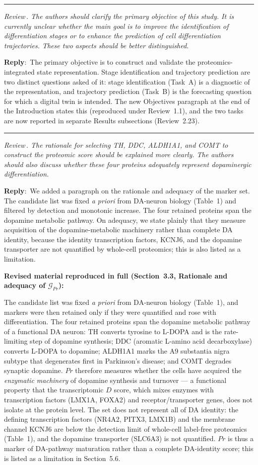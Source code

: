 \documentclass[11pt]{article}
\newcounter{reviewer}
\newcounter{point}[reviewer]
\renewcommand{\thepoint}{Review\,\thereviewer.\arabic{point}}
\newcommand{\point}[1]{\refstepcounter{point}  \bigskip \hrule \medskip \noindent \textit{{\fontseries{b}\selectfont \thepoint } #1}\par}
\newcommand{\reply}{\medskip \noindent \textbf{Reply}:\ }
\newcommand{\revisedheading}[1]{\medskip\noindent\textbf{Revised material
  reproduced in full (#1):}\par}
\newenvironment{revised}{\par\color{red}}{\par}
\begin{document}
\point{The authors should clarify the primary objective of this study. It is currently unclear whether the main goal is to improve the identification of differentiation stages or to enhance the prediction of cell differentiation trajectories. These two aspects should be better distinguished.}

\reply{The primary objective is to construct and validate the proteomics-integrated state representation. Stage identification and trajectory prediction are two distinct questions asked of it: stage identification (Task~A) is a diagnostic of the representation, and trajectory prediction (Task~B) is the forecasting question for which a digital twin is intended. The new Objectives paragraph at the end of the Introduction states this (reproduced under Review~1.1), and the two tasks are now reported in separate Results subsections (Review~2.23).}

\point{The rationale for selecting TH, DDC, ALDH1A1, and COMT to construct the proteomic score should be explained more clearly. The authors should also discuss whether these four proteins adequately represent dopaminergic differentiation.}

\reply{We added a paragraph on the rationale and adequacy of the marker set. The candidate list was fixed \textit{a priori} from DA-neuron biology (Table~1) and filtered by detection and monotonic increase. The four retained proteins span the dopamine metabolic pathway. On adequacy, we state plainly that they measure acquisition of the dopamine-metabolic machinery rather than complete DA identity, because the identity transcription factors, KCNJ6, and the dopamine transporter are not quantified by whole-cell proteomics; this is also listed as a limitation.}

\revisedheading{Section~3.3, Rationale and adequacy of $\mathcal{G}_{Pr}$}
\begin{revised}
The candidate list was fixed \textit{a priori} from DA-neuron biology (Table~1), and markers were then retained only if they were quantified and rose with differentiation. The four retained proteins span the dopamine metabolic pathway of a functional DA neuron: TH converts tyrosine to L-DOPA and is the rate-limiting step of dopamine synthesis; DDC (aromatic L-amino acid decarboxylase) converts L-DOPA to dopamine; ALDH1A1 marks the A9 substantia nigra subtype that degenerates first in Parkinson's disease; and COMT degrades synaptic dopamine. $Pr$ therefore measures whether the cells have acquired the \textit{enzymatic machinery} of dopamine synthesis and turnover --- a functional property that the transcriptomic $D$ score, which mixes enzymes with transcription factors (LMX1A, FOXA2) and receptor/transporter genes, does not isolate at the protein level. The set does not represent all of DA identity: the defining transcription factors (NR4A2, PITX3, LMX1B) and the membrane channel KCNJ6 are below the detection limit of whole-cell label-free proteomics (Table~1), and the dopamine transporter (SLC6A3) is not quantified. $Pr$ is thus a marker of DA-pathway maturation rather than a complete DA-identity score; this is listed as a limitation in Section~5.6.
\end{revised}
\end{document}
